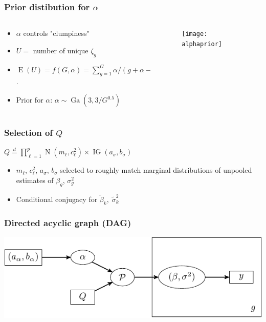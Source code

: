 \documentclass{beamer}
\newcommand{\op}{\operatorname}
\begin{document}
\begin{frame}%
  \frametitle{Prior distibution for $\alpha$}
    \begin{columns}
    \begin{column}{.5\textwidth}
      {\footnotesize
      \begin{itemize}
        \item $\alpha$ controls "clumpiness"
        \pause \item $U=$ number of unique $\zeta_g$
        \pause \item $\op{E}(U) = f(G,\alpha) = \sum_{g=1}^G \alpha/(g + \alpha - 1)$.
        \pause \item Prior for $\alpha$: $\alpha \sim \op{Ga}(3,3/G^{0.5})$
      \end{itemize}
      }
    \end{column}
    \begin{column}{.65\textwidth}
      \begin{figure}
        \centering
        \pause \texttt{[image: alphaprior]}
      \end{figure}
    \end{column}
  \end{columns}
\end{frame}

\begin{frame}%
  \frametitle{Selection of $Q$}
  $Q \stackrel{d}{=} \prod_{\ell=1}^p\op{N}(m_\ell,c^2_\ell)\times\op{IG}(a_\sigma,b_\sigma)$\\

  \vspace{.5cm}

  \begin{itemize}
    \pause \item $m_\ell$, $c^2_\ell$, $a_\sigma$, $b_\sigma$ selected to roughly match marginal distributions of unpooled estimates of $\beta_g$, $\sigma_g^2$
    \pause \item Conditional conjugacy for $\tilde{\beta}_k,\; \tilde{\sigma}_k^2$
  \end{itemize}
\end{frame}

\begin{frame}%
  \frametitle{Directed acyclic graph (DAG)}
  \centering
  \includegraphics[width=\textwidth]{my_dag_small0}
\end{frame}
\end{document}
